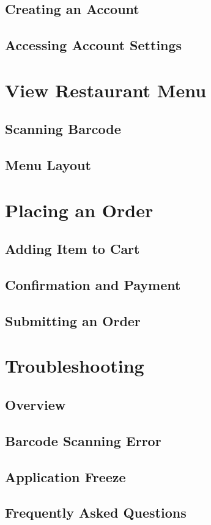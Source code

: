\documentclass[12pt, titlepage]{article}
\begin{document}
\subsection{Creating an Account}
\subsection{Accessing Account Settings}

\section{View Restaurant Menu}
\subsection{Scanning Barcode}
\subsection{Menu Layout}

\section{Placing an Order}
\subsection{Adding Item to Cart}
\subsection{Confirmation and Payment}
\subsection{Submitting an Order}

\section{Troubleshooting}
\subsection{Overview}
\subsection{Barcode Scanning Error}
\subsection{Application Freeze}
\subsection{Frequently Asked Questions}
\end{document}
